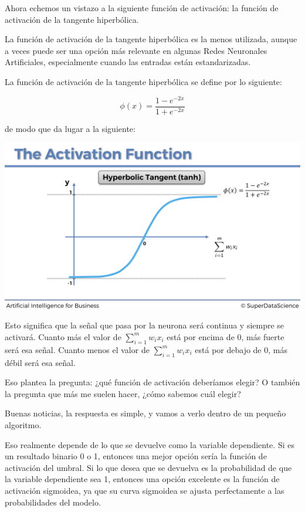 \documentclass[]{book}
\begin{document}
Ahora echemos un vistazo a la siguiente función de activación: la función de activación de la tangente hiperbólica.

La función de activación de la tangente hiperbólica es la menos utilizada, aunque a veces puede ser una opción más relevante en algunas Redes Neuronales Artificiales, especialmente cuando las entradas están estandarizadas.

La función de activación de la tangente hiperbólica se define por lo siguiente:

\[\phi(x) = \frac{1-e^{-2x}}{1+e^{-2x}}\]

de modo que da lugar a la siguiente:

\includegraphics{Images/ANN_13.png}

Esto significa que la señal que pasa por la neurona será continua y siempre se activará. Cuanto más el valor de \(\sum_{i = 1}^m w_i x_i\) está por encima de 0, más fuerte será esa señal. Cuanto menos el valor de \(\sum_{i = 1}^m w_i x_i\) está por debajo de 0, más débil será esa señal.

Eso plantea la pregunta: ¿qué función de activación deberíamos elegir? O también la pregunta que más me suelen hacer, ¿cómo sabemos cuál elegir?

Buenas noticias, la respuesta es simple, y vamos a verlo dentro de un pequeño algoritmo.

Eso realmente depende de lo que se devuelve como la variable dependiente. Si es un resultado binario 0 o 1, entonces una mejor opción sería la función de activación del umbral. Si lo que desea que se devuelva es la probabilidad de que la variable dependiente sea 1, entonces una opción excelente es la función de activación sigmoidea, ya que su curva sigmoidea se ajusta perfectamente a las probabilidades del modelo.
\end{document}
